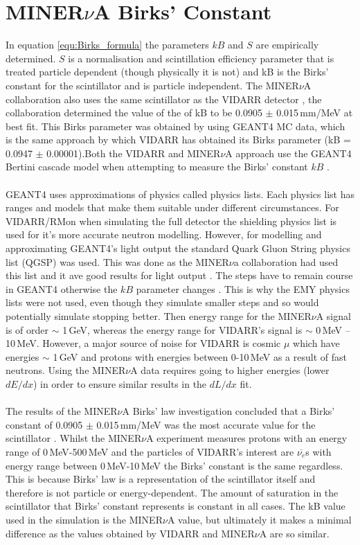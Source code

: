 \section{MINER$\nu$A Birks' Constant}\label{sec:GEANT4Simulation_MINERvABirksConstant}
In equation \ref{equ:Birks_formula} the parameters $kB$ and $S$ are empirically determined. $S$ is a normalisation and scintillation efficiency parameter that is treated particle dependent (though physically it is not) and kB is the Birks' constant for the scintillator and is particle independent. The MINER$\nu$A collaboration \cite{aliaga_2015} also uses the same scintillator as the VIDARR detector \cite{aliaga_2014}, the collaboration determined the value of the of kB to be 0.0905 $\pm$ 0.015\,mm/MeV at best fit. This Birks parameter was obtained by using GEANT4 MC data, which is the same approach by which VIDARR has obtained its Birks parameter (kB = 0.0947 $\pm$ 0.00001).Both the VIDARR and MINER$\nu$A approach use the GEANT4 Bertini cascade model when attempting to measure the Birks' constant $kB$ \cite{Heikkinen_2003}. 
\\\\GEANT4 uses approximations of physics called physics lists. Each physics list has ranges and models that make them suitable under different circumstances. For VIDARR/RMon when simulating the full detector the shielding physics list is used for it's more accurate neutron modelling. However, for modelling and approximating GEANT4's light output the standard Quark Gluon String physics list (QGSP) was used. This was done as the MINER$\nu$a collaboration had used this list and it ave good results for light output \cite{Patrick_2018}. The steps have to remain course in GEANT4 otherwise the $kB$ parameter changes  \cite{aliaga_2015}. This is why the EMY physics lists were not used, even though they simulate smaller steps and so would potentially simulate stopping better. Then energy range for the MINER$\nu$A signal is of order $\sim$ 1\,GeV, whereas the energy range for VIDARR's signal is $\sim$ 0\,MeV -- 10\,MeV. However, a major source of noise for VIDARR is cosmic $\mu$ which have energies $\sim$ 1\,GeV and protons with energies between 0-10\,MeV as a result of fast neutrons. Using the MINER$\nu$A data requires going to higher energies (lower $dE/dx$) in order to ensure similar results in the $dL/dx$ fit.  
\\\\The results of the MINER$\nu$A Birks' law investigation concluded that a Birks' constant of 0.0905 $\pm$ 0.015\,mm/MeV was the most accurate value for the scintillator \cite{aliaga_2015}. Whilst the MINER$\nu$A experiment measures protons with an energy range of 0\,MeV-500\,MeV and the particles of VIDARR's interest are $\overline{\nu_{e}}$s with energy range between 0\,MeV-10\,MeV the Birks' constant is the same regardless. This is because Birks' law is a representation of the scintillator itself and therefore is not particle or energy-dependent. The amount of saturation in the scintillator that Birks' constant represents is constant in all cases. The kB value used in the simulation is the MINER$\nu$A value, but ultimately it makes a minimal difference as the values obtained by VIDARR and MINER$\nu$A are so similar. 
